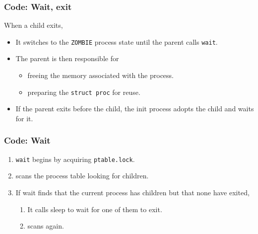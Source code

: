 \documentclass{beamer}
\begin{document}

\begin{frame}[t]
  \frametitle{Code: Wait, exit}

  When a child exits,
  \begin{itemize}
  \item It switches to the \texttt{ZOMBIE} process state until the parent
    calls \texttt{wait}.
  \item The parent is then responsible for
    \begin{itemize}
    \item freeing the memory associated with the process.
    \item preparing the \texttt{struct proc} for reuse.
    \end{itemize}
  \item If the parent exits before the child, the init process adopts
    the child and waits for it.
  \end{itemize}
  
\end{frame}


\begin{frame}[t]
  \frametitle{Code: Wait}

  \begin{enumerate}
  \item \texttt{wait} begins by acquiring \texttt{ptable.lock}.
  \item scans the process table looking for children.
  \item If wait finds that the current process has children but that none have exited,
    \begin{enumerate}
    \item It calls sleep to wait for one of them to exit.
    \item scans again.
    \end{enumerate}
  \end{enumerate}
  
\end{frame}

\end{document}
